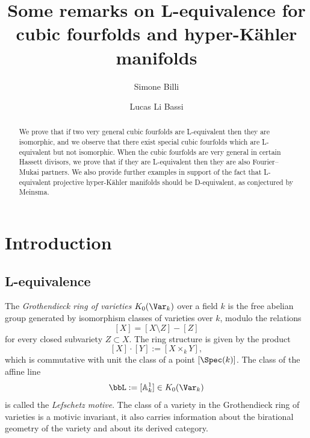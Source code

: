 \documentclass{amsart}
\title{Some remarks on L-equivalence for cubic fourfolds and hyper-Kähler manifolds}
\author{Simone Billi}
\author{Lucas Li Bassi}
\date{}
\begin{document}
\maketitle

\begin{abstract}
    We prove that if two very general cubic fourfolds are L-equivalent then they are isomorphic, and we observe that there exist special cubic fourfolds which are L-equivalent but not isomorphic. When the cubic fourfolds are very general in certain Hassett divisors, we prove that if they are L-equivalent then they are also Fourier--Mukai partners. 
    We also provide further examples in support of the fact that L-equivalent projective hyper-Kähler manifolds should be D-equivalent, as conjectured by Meinsma.  
\end{abstract}
\section{Introduction}

\subsection{L-equivalence}
The \textit{Grothendieck ring of varieties} \(K_0(\Var_k)\) over a field \(k\) is the free abelian group generated by isomorphism classes of varieties over \(k\), modulo the relations
\[[X]=[X\setminus Z]-[Z]\]
for every closed subvariety \(Z\subset X\).
The ring structure is given by the product 
\[[X]\cdot [Y]:=[X\times_k Y],\]
which is commutative with unit the class of a point \([\Spec(k)]\). 
The class of the affine line 
\[\bbL:=[\mathbb{A}^1_k]\in K_0(\Var_k)\]
is called the \textit{Lefschetz motive}. 
The class of a variety in the Grothendieck ring of varieties is a motivic invariant, it also carries information about the birational geometry of the variety and about its derived category.
\end{document}
